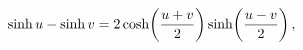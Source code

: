 \[\mathop{\sinh\/}\nolimits u-\mathop{\sinh\/}\nolimits v=2\mathop{\cosh\/}%
\nolimits\!\left(\frac{u+v}{2}\right)\mathop{\sinh\/}\nolimits\!\left(\frac{u-%
v}{2}\right),\]